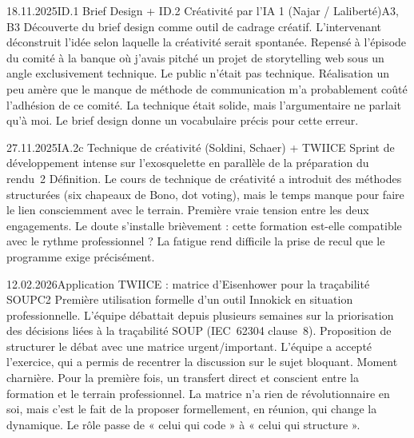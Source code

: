 \begin{jbentry}{18.11.2025}{ID.1 Brief Design + ID.2 Créativité par l'IA 1 (Najar / Laliberté)}{A3, B3}
\jbobs
Découverte du brief design comme outil de cadrage créatif. L'intervenant déconstruit l'idée selon laquelle la créativité serait spontanée. Repensé à l'épisode du comité à la banque où j'avais pitché un projet de storytelling web sous un angle exclusivement technique. Le public n'était pas technique.
\jbres
Réalisation un peu amère que le manque de méthode de communication m'a probablement coûté l'adhésion de ce comité. La technique était solide, mais l'argumentaire ne parlait qu'à moi. Le brief design donne un vocabulaire précis pour cette erreur.
\end{jbentry}

\begin{jbentry}{27.11.2025}{IA.2c Technique de créativité (Soldini, Schaer) + TWIICE}{}
\jbobs
Sprint de développement intense sur l'exosquelette en parallèle de la préparation du rendu~2 Définition. Le cours de technique de créativité a introduit des méthodes structurées (six chapeaux de Bono, dot voting), mais le temps manque pour faire le lien consciemment avec le terrain.
\jbres
Première vraie tension entre les deux engagements. Le doute s'installe brièvement : cette formation est-elle compatible avec le rythme professionnel ? La fatigue rend difficile la prise de recul que le programme exige précisément.
\end{jbentry}


\begin{jbentry}{12.02.2026}{Application TWIICE : matrice d'Eisenhower pour la traçabilité SOUP}{C2}
\jbobs
Première utilisation formelle d'un outil Innokick en situation professionnelle. L'équipe débattait depuis plusieurs semaines sur la priorisation des décisions liées à la traçabilité SOUP (IEC~62304 clause~8). Proposition de structurer le débat avec une matrice urgent/important. L'équipe a accepté l'exercice, qui a permis de recentrer la discussion sur le sujet bloquant.
\jbres
Moment charnière. Pour la première fois, un transfert direct et conscient entre la formation et le terrain professionnel. La matrice n'a rien de révolutionnaire en soi, mais c'est le fait de la proposer formellement, en réunion, qui change la dynamique. Le rôle passe de « celui qui code » à « celui qui structure ».
\end{jbentry}

